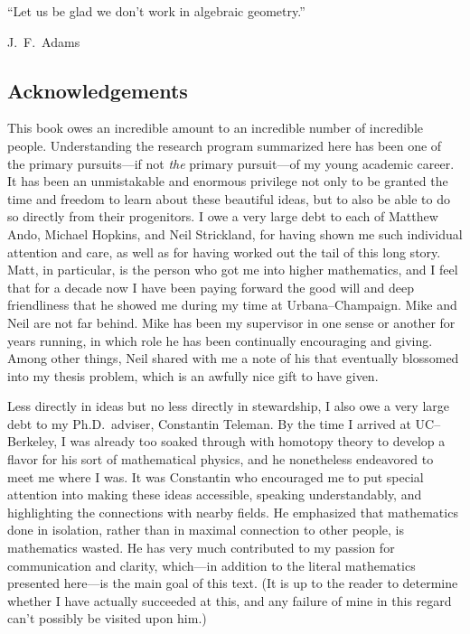 
% 

\newpage

\vspace*{\fill}

\epigraph{``Let us be glad we don't work in algebraic geometry.''}{J.\ F.\ Adams~\cite[Section 2.1]{AdamsInfiniteLoopSpaces}}

\newpage

\subsection*{Acknowledgements}


This book owes an incredible amount to an incredible number of incredible people.  Understanding the research program summarized here has been one of the primary pursuits---if not \emph{the} primary pursuit---of my young academic career.  It has been an unmistakable and enormous privilege not only to be granted the time and freedom to learn about these beautiful ideas, but to also be able to do so directly from their progenitors.  I owe a very large debt to each of Matthew Ando, Michael Hopkins, and Neil Strickland, for having shown me such individual attention and care, as well as for having worked out the tail of this long story.  Matt, in particular, is the person who got me into higher mathematics, and I feel that for a decade now I have been paying forward the good will and deep friendliness that he showed me during my time at Urbana--Champaign.  Mike and Neil are not far behind.  Mike has been my supervisor in one sense or another for years running, in which role he has been continually encouraging and giving.  Among other things, Neil shared with me a note of his that eventually blossomed into my thesis problem, which is an awfully nice gift to have given.

Less directly in ideas but no less directly in stewardship, I also owe a very large debt to my Ph.D.\ adviser, Constantin Teleman.  By the time I arrived at UC--Berkeley, I was already too soaked through with homotopy theory to develop a flavor for his sort of mathematical physics, and he nonetheless endeavored to meet me where I was.  It was Constantin who encouraged me to put special attention into making these ideas accessible, speaking understandably, and highlighting the connections with nearby fields.  He emphasized that mathematics done in isolation, rather than in maximal connection to other people, is mathematics wasted.  He has very much contributed to my passion for communication and clarity, which---in addition to the literal mathematics presented here---is the main goal of this text.  (It is up to the reader to determine whether I have actually succeeded at this, and any failure of mine in this regard can't possibly be visited upon him.)

